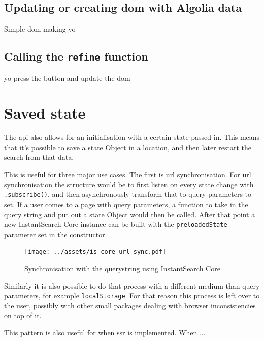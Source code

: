 \subsection{Updating or creating \acrshort{dom} with Algolia data}
\label{subs:data_to_dom}

Simple dom making yo %

\subsection{Calling the {\tt refine} function}
\label{subs:refining}

yo press the button and update the dom %


\section{Saved state} %
\label{sec:saved_state}

The \acrshort{api} also allows for an initialisation with a certain state passed in. This means that it's possible to save a state Object in a location, and then later restart the search from that data. 

This is useful for three major use cases. The first is \acrshort{url} synchronisation. For \acrshort{url} synchronisation the structure would be to first listen on every state change with {\tt .subscribe()}, and then asynchronously transform that to query parameters to set. If a user comes to a page with query parameters, a function to take in the query string and put out a state Object would then be called. After that point a new InstantSearch Core instance can be built with the {\tt preloadedState} parameter set in the constructor.

\begin{figure}[H]
  \centering
  \texttt{[image: ../assets/is-core-url-sync.pdf]}
  \caption{Synchronisation with the querystring using InstantSearch Core}
  \label{figure:is-core-url-sync}
\end{figure} %

Similarly it is also possible to do that process with a different medium than query parameters, for example {\tt localStorage}. For that reason this process is left over to the user, possibly with other small packages dealing with browser inconsistencies on top of it. 

This pattern is also useful for when \acrfull{ssr} is implemented. When ...%

